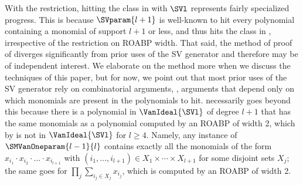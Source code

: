 \documentclass{toc}
\begin{document}
With the restriction, 
hitting the class in  with $\SVl$ represents fairly specialized progress. This is because $\SVparam{l+1}$ is well-known to hit every polynomial containing a monomial of support $l+1$ or less, and thus hits the class in , irrespective of the restriction on ROABP width. That said, the method of proof of  diverges
significantly from prior uses of the SV generator
and therefore may be of independent interest.
We elaborate on the method more when we discuss the techniques of this paper, but for now,
we point out that most prior uses of the SV generator rely on combinatorial
arguments,
\ie, arguments that depend only on which monomials are present in
the polynomials to hit.
 necessarily goes beyond this
because there is a polynomial in \(\VanIdeal{\SVl}\) of degree \(l+1\) that
has the same monomials as a polynomial computed by an ROABP of width 2, which by  is not in \(\VanIdeal{\SVl}\) for $l \ge 4$.
Namely, any instance of \(\SMVanOneparam{l-1}{l}\) contains exactly all the
monomials of the form \(x_{i_1}\cdot x_{i_2}\cdot \dots \cdot x_{i_{l+1}}\)
with \((i_1,\ldots,i_{l+1})\in X_1\times \cdots \times X_{l+1}\) for some
disjoint sets \(X_j\);
the same goes for \(\prod_j \sum_{i_j\in X_j} x_{i_j}\),
which is computed by an ROABP of width 2.
\end{document}
